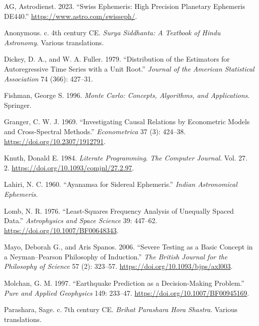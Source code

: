 \documentclass[
  11pt,
  a4paper,
  oneside,
  openany]{article}
\newlength{\cslhangindent}
\newenvironment{CSLReferences}[2] %
 {\begin{list}{}{%
  \setlength{\itemindent}{0pt}
  \setlength{\leftmargin}{0pt}
  \setlength{\parsep}{0pt}
  \ifodd #1
   \setlength{\leftmargin}{\cslhangindent}
   \setlength{\itemindent}{-1\cslhangindent}
  \fi
  \setlength{\itemsep}{#2\baselineskip}}}
 {\end{list}}
\begin{document}
\label{refs}
\begin{CSLReferences}{1}{0}
AG, Astrodienst. 2023. {``Swiss Ephemeris: High Precision Planetary
Ephemeris DE440.''} \url{https://www.astro.com/swisseph/}.

Anonymous. c. 4th century CE. \emph{Surya Siddhanta: A Textbook of Hindu
Astronomy}. Various translations.

Dickey, D. A., and W. A. Fuller. 1979. {``Distribution of the Estimators
for Autoregressive Time Series with a Unit Root.''} \emph{Journal of the
American Statistical Association} 74 (366): 427--31.

Fishman, George S. 1996. \emph{Monte Carlo: Concepts, Algorithms, and
Applications}. Springer.

Granger, C. W. J. 1969. {``Investigating Causal Relations by Econometric
Models and Cross-Spectral Methods.''} \emph{Econometrica} 37 (3):
424--38. \url{https://doi.org/10.2307/1912791}.

Knuth, Donald E. 1984. \emph{Literate Programming}. \emph{The Computer
Journal}. Vol. 27. 2. \url{https://doi.org/10.1093/comjnl/27.2.97}.

Lahiri, N. C. 1960. {``Ayanamsa for Sidereal Ephemeris.''} \emph{Indian
Astronomical Ephemeris}.

Lomb, N. R. 1976. {``Least-Squares Frequency Analysis of Unequally
Spaced Data.''} \emph{Astrophysics and Space Science} 39: 447--62.
\url{https://doi.org/10.1007/BF00648343}.

Mayo, Deborah G., and Aris Spanos. 2006. {``Severe Testing as a Basic
Concept in a Neyman--Pearson Philosophy of Induction.''} \emph{The
British Journal for the Philosophy of Science} 57 (2): 323--57.
\url{https://doi.org/10.1093/bjps/axl003}.

Molchan, G. M. 1997. {``Earthquake Prediction as a Decision-Making
Problem.''} \emph{Pure and Applied Geophysics} 149: 233--47.
\url{https://doi.org/10.1007/BF00945169}.

Parashara, Sage. c. 7th century CE. \emph{Brihat Parashara Hora
Shastra}. Various translations.


\end{CSLReferences}
\end{document}
